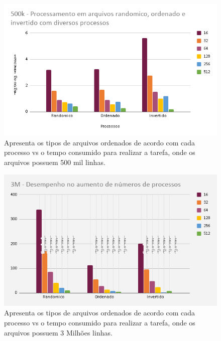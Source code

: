 \documentclass[12pt]{article}
\begin{document}
    \begin{figure}[!htb]
         \centering
         \includegraphics[scale=.5]{chart/chart2.png}
         \caption{Apresenta os tipos de arquivos ordenados de acordo com cada processo vs o tempo consumido para realizar a tarefa, onde os arquivos possuem 500 mil linhas.}
         \label{img:chart2}
    \end{figure}
   
    \begin{figure}[!htb]
         \centering
         \includegraphics[scale=0.5]{chart/chart3.png}
         \caption{Apresenta os tipos de arquivos ordenados de acordo com cada processo vs o tempo consumido para realizar a tarefa, onde os arquivos possuem 3 Milhões linhas.}
         \label{img:chart3}
    \end{figure}
   
\end{document}
